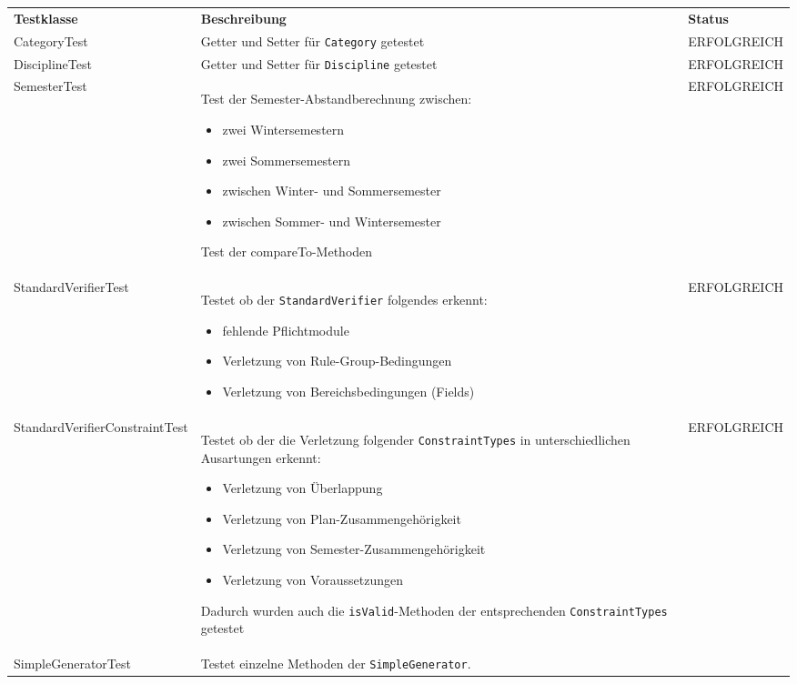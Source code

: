 \begin{longtable}{| >{\hspace{0pt}} p{} | >{\hspace{0pt}} p{} | >{\hspace{0pt}} p{} |}
	\hline
	\textbf{Testklasse} & \textbf{Beschreibung} & \textbf{Status} \\ 
	\hhline{|=|=|=|}  
	\endfirsthead
	\endhead
	CategoryTest & Getter und Setter für \texttt{Category} getestet & ERFOLGREICH \\
	\hline
	DisciplineTest & Getter und Setter für \texttt{Discipline} getestet & ERFOLGREICH \\
	\hline
	SemesterTest & Test der Semester-Abstandberechnung zwischen:
	\begin{itemize}
		\item zwei Wintersemestern
		\item zwei Sommersemestern
		\item zwischen Winter- und Sommersemester
		\item zwischen Sommer- und Wintersemester
	\end{itemize}
	Test der compareTo-Methoden & ERFOLGREICH \\
	\hline
	StandardVerifierTest & Testet ob der \texttt{StandardVerifier} folgendes erkennt:
	\begin{itemize}
		\item fehlende Pflichtmodule
		\item Verletzung von Rule-Group-Bedingungen
		\item Verletzung von Bereichsbedingungen (Fields)
	\end{itemize} & ERFOLGREICH \\
	\hline
	StandardVerifierConstraintTest & Testet ob der die Verletzung folgender \texttt{ConstraintTypes} in unterschiedlichen Ausartungen erkennt:
	\begin{itemize}
		\item Verletzung von Überlappung 
		\item Verletzung von Plan-Zusammengehörigkeit 
		\item Verletzung von Semester-Zusammengehörigkeit 
		\item Verletzung von Voraussetzungen
	\end{itemize}
	Dadurch wurden auch die \texttt{isValid}-Methoden der entsprechenden \texttt{ConstraintTypes} getestet & ERFOLGREICH \\
	\hline
		SimpleGeneratorTest & Testet einzelne Methoden der \texttt{SimpleGenerator}. 

\end{longtable}
